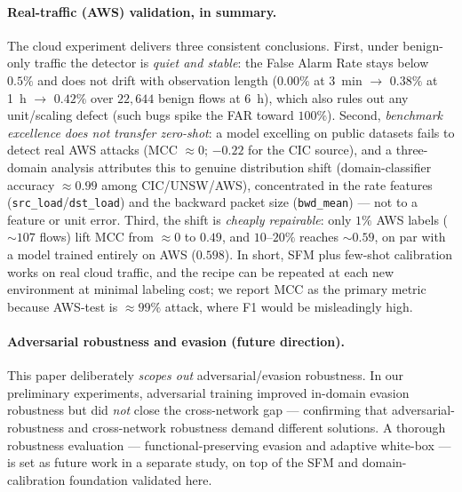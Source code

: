 \documentclass[preprint,12pt,authoryear]{elsarticle}
\begin{document}
\paragraph{Real-traffic (AWS) validation, in summary.} The cloud experiment
delivers three consistent conclusions. First, under benign-only traffic the
detector is \emph{quiet and stable}: the False Alarm Rate stays below $0.5\%$ and
does not drift with observation length ($0.00\%$ at 3~min $\rightarrow$ $0.38\%$ at
1~h $\rightarrow$ $0.42\%$ over $22{,}644$ benign flows at 6~h), which also rules
out any unit/scaling defect (such bugs spike the FAR toward $100\%$). Second,
\emph{benchmark excellence does not transfer zero-shot}: a model excelling on public
datasets fails to detect real AWS attacks (MCC $\approx 0$; $-0.22$ for the CIC
source), and a three-domain analysis attributes this to genuine distribution shift
(domain-classifier accuracy $\approx 0.99$ among CIC/UNSW/AWS), concentrated in the
rate features (\texttt{src\_load}/\texttt{dst\_load}) and the backward packet size
(\texttt{bwd\_mean}) --- not to a feature or unit error. Third, the shift is
\emph{cheaply repairable}: only $1\%$ AWS labels ($\sim$$107$ flows) lift MCC from
$\approx 0$ to $0.49$, and $10$--$20\%$ reaches $\sim 0.59$, on par with a model
trained entirely on AWS ($0.598$). In short, SFM plus few-shot calibration works on
real cloud traffic, and the recipe can be repeated at each new environment at
minimal labeling cost; we report MCC as the primary metric because AWS-test is
$\approx 99\%$ attack, where F1 would be misleadingly high.

\paragraph{Adversarial robustness and evasion (future direction).} This paper
deliberately \emph{scopes out} adversarial/evasion robustness. In our preliminary
experiments, adversarial training improved in-domain evasion robustness but did
\emph{not} close the cross-network gap --- confirming that adversarial-robustness
and cross-network robustness demand different solutions. A thorough robustness
evaluation --- functional-preserving evasion and adaptive white-box --- is set as
future work in a separate study, on top of the SFM and domain-calibration
foundation validated here.
\end{document}
